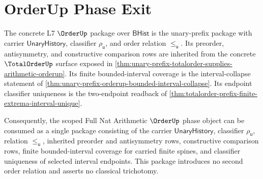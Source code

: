 \section{OrderUp Phase Exit}
\label{sec:totalorder-orderup-phase-exit}

\begin{theorem}
\label{thm:unary-prefix-orderup-phase-exit-package}
The concrete L7 $\OrderUp$ package over $\mathsf{BHist}$ is the unary-prefix
package with carrier $\mathsf{UnaryHistory}$, classifier $\rho_{\mathsf{u}}$,
and order relation $\le_{\mathsf{u}}$. Its preorder, antisymmetry, and
constructive comparison rows are inherited from the concrete $\TotalOrderUp$
surface exposed in
\autoref{thm:unary-prefix-totalorder-supplies-arithmetic-orderup}. Its finite
bounded-interval coverage is the interval-collapse statement of
\autoref{thm:unary-prefix-orderup-bounded-interval-collapse}. Its endpoint
classifier uniqueness is the two-endpoint readback of
\autoref{thm:totalorder-prefix-finite-extrema-interval-unique}.

Consequently, the scoped Full Nat Arithmetic $\OrderUp$ phase object can be
consumed as a single package consisting of the carrier
$\mathsf{UnaryHistory}$, classifier $\rho_{\mathsf{u}}$, relation
$\le_{\mathsf{u}}$, inherited preorder and antisymmetry rows, constructive
comparison rows, finite bounded-interval coverage for carried finite spines,
and classifier uniqueness of selected interval endpoints. This package
introduces no second order relation and asserts no classical trichotomy.
\end{theorem}
